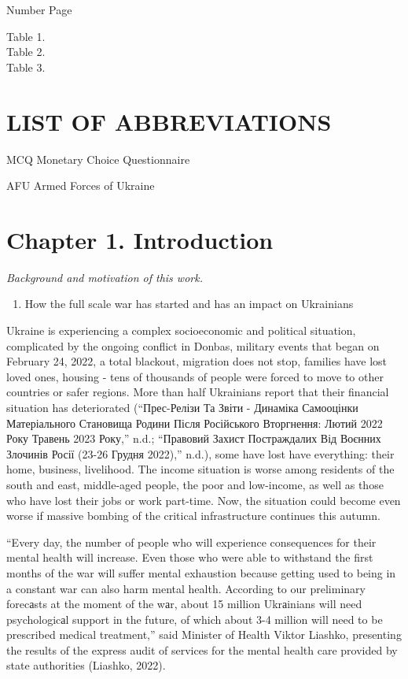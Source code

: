 \documentclass[
  letterpaper,
  DIV=11,
  numbers=noendperiod]{scrartcl}
\providecommand{\tightlist}{%
  \setlength{\itemsep}{0pt}\setlength{\parskip}{0pt}}\usepackage{longtable,booktabs,array}
\begin{document}
Number Page

Table 1.\\
Table 2.\\
Table 3.

\hypertarget{list-of-abbreviations}{%
\section{LIST OF ABBREVIATIONS}\label{list-of-abbreviations}}

MCQ Monetary Choice Questionnaire

AFU Armed Forces of Ukraine

\hypertarget{chapter-1.-introduction}{%
\section{Chapter 1. Introduction}\label{chapter-1.-introduction}}

\emph{Background and motivation of this work.}

\begin{enumerate}
\def\labelenumi{\arabic{enumi}.}
\tightlist
\item
  How the full scale war has started and has an impact on Ukrainians
\end{enumerate}

Ukraine is experiencing a complex socioeconomic and political situation,
complicated by the ongoing conflict in Donbas, military events that
began on February 24, 2022, a total blackout, migration does not stop,
families have lost loved ones, housing - tens of thousands of people
were forced to move to other countries or safer regions. More than half
Ukrainians report that their financial situation has deteriorated
({``Прес-Релізи Та Звіти - Динаміка Самооцінки Матеріального Становища
Родини Після Російського Вторгнення: Лютий 2022 Року {\textendash}
Травень 2023 Року,''} n.d.; {``Правовий Захист Постраждалих Від Воєнних
Злочинів Росії (23-26 Грудня 2022),''} n.d.), some have lost have
everything: their home, business, livelihood. The income situation is
worse among residents of the south and east, middle-aged people, the
poor and low-income, as well as those who have lost their jobs or work
part-time. Now, the situation could become even worse if massive bombing
of the critical infrastructure continues this autumn.

``Every day, the number of people who will experience consequences for
their mental health will increase. Even those who were able to withstand
the first months of the war will suffer mental exhaustion because
getting used to being in a constant war can also harm mental health.
According to our preliminary forecаsts at the moment of the wаr, about
15 million Ukrаinians will need psychologicаl support in the future, of
which about 3-4 million will need to be prescribed medical treatment,''
said Minister of Health Viktor Liashko, presenting the results of the
express audit of services for the mental health care provided by state
authorities (Liashko, 2022).
\end{document}
